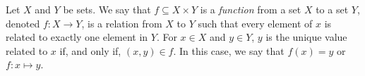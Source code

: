 \guard



\begin{defn}
\label{defn:function}
  Let $X$ and $Y$ be sets.
  We say that $f\subseteq X\times Y$ is a \emph{function} from a set $X$ to a set $Y$, denoted $f:X\to Y$, is a relation from $X$ to $Y$ such that every element of $x$ is related to exactly one element in $Y$.
  For $x\in X$ and $y\in Y$, $y$ is the unique value related to $x$ if, and only if, $(x,y)\in f$.
  In this case, we say that $f(x)=y$ or $f:x\mapsto y$.
\end{defn}
